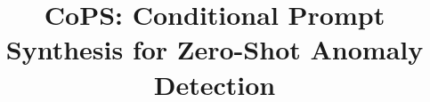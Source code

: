 \documentclass[10pt,twocolumn,letterpaper]{article}
\title{CoPS: Conditional Prompt Synthesis for Zero-Shot Anomaly Detection}
\begin{document}
\setcounter{table}{0}
\renewcommand{\thetable}{B\arabic{table}}
\setcounter{figure}{0}
\renewcommand{\thefigure}{B\arabic{figure}}
\setcounter{equation}{0}
\renewcommand{\theequation}{B\arabic{equation}}
\renewcommand{\thesection}{B\arabic{section}}

\end{document}

